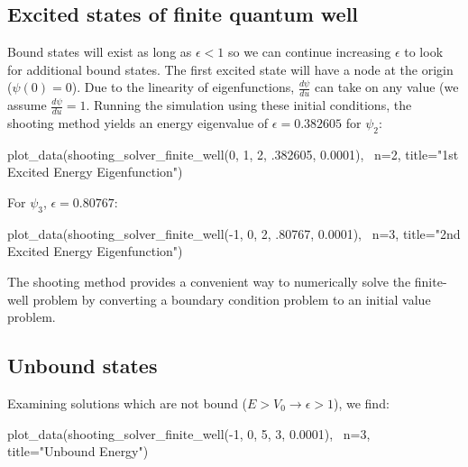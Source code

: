 \documentclass{article}
\begin{document}
\subsection{Excited states of finite quantum well}
Bound states will exist as long as $\epsilon < 1$ so we can continue increasing
$\epsilon$ to look for additional bound states. The first excited state will
have a node at the origin ($\psi(0) = 0$). Due to the linearity of eigenfunctions, $\frac{d\psi}{du}$ can take on any value (we assume $\frac{d\psi}{du} = 1$. Running the simulation using these initial conditions, the shooting method yields an energy eigenvalue of $\epsilon = 0.382605$
for $\psi_2$:

\begin{sageblock}
    plot_data(shooting_solver_finite_well(0, 1, 2, .382605, 0.0001), \
              n=2, title="1st Excited Energy Eigenfunction")
\end{sageblock}
\begin{figure}[H]
\end{figure}

For $\psi_3$, $\epsilon = 0.80767$:

\begin{sageblock}
    plot_data(shooting_solver_finite_well(-1, 0, 2, .80767, 0.0001), \
              n=3, title="2nd Excited Energy Eigenfunction")
\end{sageblock}
\begin{figure}[H]
\end{figure}

The shooting method provides a convenient way to numerically solve the
finite-well problem by converting a boundary condition problem to an initial value problem.

\subsection{Unbound states}
Examining solutions which are not bound ($E > V_0 \rightarrow \epsilon > 1$), we find:

\begin{sageblock}
    plot_data(shooting_solver_finite_well(-1, 0, 5, 3, 0.0001), \
              n=3, title="Unbound Energy")
\end{sageblock}
\begin{figure}[H]
\end{figure}
\end{document}
